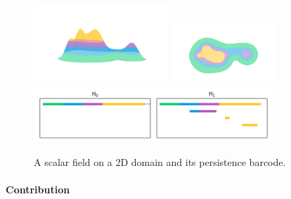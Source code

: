 
\begin{figure}[htbp]
  \centering
  \includegraphics[trim=200 200 200 200, clip, width=0.45\textwidth]{figures/surf-side.png}
  \includegraphics[trim=250 0 50 100, clip, width=0.35\textwidth]{figures/surf-top.png}
  \includegraphics[width=0.8\textwidth]{figures/scalar_barcode_true.png}
  \caption{A scalar field on a 2D domain and its persistence barcode.}
\end{figure}

\paragraph*{Contribution}

